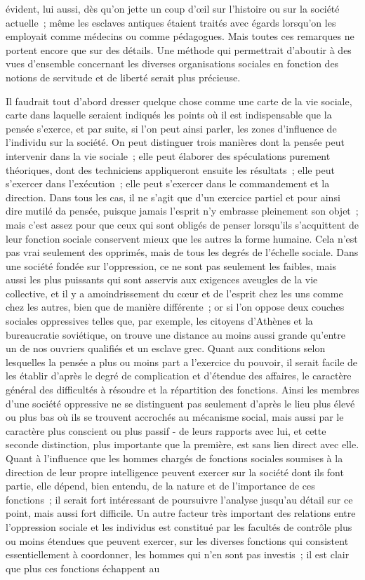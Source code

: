 \documentclass[french,twoside]{book} %
\begin{document}
évident, lui aussi, dès qu'on jette un coup d'œil sur l'histoire ou sur la société actuelle ; même les esclaves antiques étaient traités avec égards lorsqu'on les employait comme médecins ou comme pédagogues. Mais toutes ces remarques ne portent encore que sur des détails. Une méthode qui permettrait d'aboutir à des vues d'ensemble concernant les diverses organisations sociales en fonction des notions de servitude et de liberté serait plus précieuse.\par
Il faudrait tout d'abord dresser quelque chose comme une carte de la vie sociale, carte dans laquelle seraient indiqués les points où il est indispensable que la pensée s'exerce, et par suite, si l'on peut ainsi parler, les zones d'influence de l'individu sur la société. On peut distinguer trois manières dont la pensée peut intervenir dans la vie sociale ; elle peut élaborer des spéculations purement théoriques, dont des techniciens appliqueront ensuite les résultats ; elle peut s'exercer dans l'exécution ; elle peut s'exercer dans le commandement et la direction. Dans tous les cas, il ne s'agit que d'un exercice partiel et pour ainsi dire mutilé da pensée, puisque jamais l'esprit n'y embrasse pleinement son objet ; mais c'est assez pour que ceux qui sont obligés de penser lorsqu'ils s'acquittent de leur fonction sociale conservent mieux que les autres la forme humaine. Cela n'est pas vrai seulement des opprimés, mais de tous les degrés de l'échelle sociale. Dans une société fondée sur l'oppression, ce ne sont pas seulement les faibles, mais aussi les plus puissants qui sont asservis aux exigences aveugles de la vie collective, et il y a amoindrissement du cœur et de l'esprit chez les uns comme chez les autres, bien que de manière différente ; or si l'on oppose deux couches sociales oppressives telles que, par exemple, les citoyens d'Athènes et la bureaucratie soviétique, on trouve une distance au moins aussi grande qu'entre un de nos ouvriers qualifiés et un esclave grec. Quant aux conditions selon lesquelles la pensée a plus ou moins part a l'exercice du pouvoir, il serait facile de les établir d'après le degré de complication et d'étendue des affaires, le caractère général des difficultés à résoudre et la répartition des fonctions. Ainsi les membres d'une société oppressive ne se distinguent pas seulement d'après le lieu plus élevé ou plus bas où ils se trouvent accrochés au mécanisme social, mais aussi par le caractère plus conscient ou plus passif - de leurs rapports avec lui, et cette seconde distinction, plus importante que la première, est sans lien direct avec elle. Quant à l'influence que les hommes chargés de fonctions sociales soumises à la direction de leur propre intelligence peuvent exercer sur la société dont ils font partie, elle dépend, bien entendu, de la nature et de l'importance de ces fonctions ; il serait fort intéressant de poursuivre l'analyse jusqu'au détail sur ce point, mais aussi fort difficile. Un autre facteur très important des relations entre l'oppression sociale et les individus est constitué par les facultés de contrôle plus ou moins étendues que peuvent exercer, sur les diverses fonctions qui consistent essentiellement à coordonner, les hommes qui n'en sont pas investis ; il est clair que plus ces fonctions échappent au 
\end{document}
